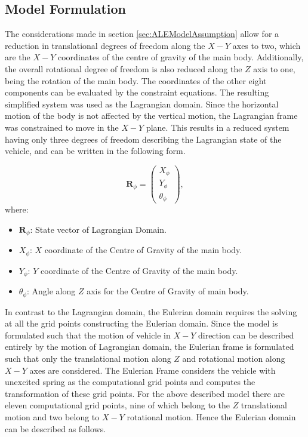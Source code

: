 \subsection{Model Formulation}
\label{subsection:ALEModelFormulation}
The considerations made in section \ref{sec:ALEModelAssumption} allow for a reduction in translational degrees of freedom along the $X-Y$ axes to two, which are the $X-Y$ coordinates of the centre of gravity of the main body. Additionally, the overall rotational degree of freedom is also reduced along the $Z$ axis to one, being the rotation of the main body. The coordinates of the other eight components can be evaluated by the constraint equations. The resulting simplified system was used as the Lagrangian domain. Since the horizontal motion of the body is not affected by the vertical motion, the Lagrangian frame was constrained to move in the $X-Y$ plane. This results in a reduced system having only three degrees of freedom describing the Lagrangian state of the vehicle, and can be written in the following form. \par
\begin{equation}
     \mathbf{R}_{\phi} = \begin{pmatrix} 
                        X_{\phi} \\
                        Y_{\phi} \\
                        \theta_{\phi}
                        \end{pmatrix},
\end{equation}
where:
\begin{itemize}
    \item $\mathbf{R}_{\phi}$: State vector of Lagrangian Domain.
    \item $X_{\phi}$: $X$ coordinate of the Centre of Gravity of the main body.
    \item $Y_{\phi}$: $Y$ coordinate of the Centre of Gravity of the main body.
    \item $\theta_{\phi}$: Angle along $Z$ axis for the Centre of Gravity of main body.
\end{itemize}


\noindent In contrast to the Lagrangian domain, the Eulerian domain requires the solving at all the grid points constructing the Eulerian domain. Since the model is formulated such that the motion of vehicle in $X-Y$ direction can be described entirely by the motion of Lagrangian domain, the Eulerian frame is formulated such that only the translational motion along $Z$ and rotational motion along $X-Y$ axes are considered. The Eulerian Frame considers the vehicle with unexcited spring as the computational grid points and computes the transformation of these grid points. For the above described model there are eleven computational grid points, nine of which belong to the $Z$ translational motion and two belong to $X-Y$ rotational motion. Hence the Eulerian domain can be described as follows.

